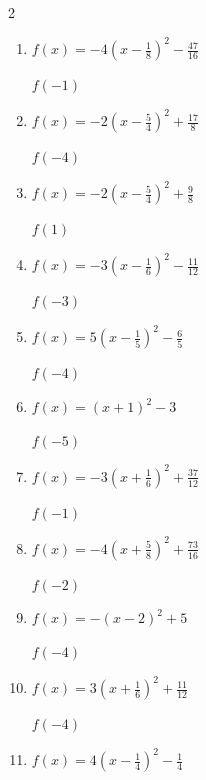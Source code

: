 \begin{multicols}{2}
\begin{enumerate}
$f(-3)$
        \phantom{$=-41$}

  \item $\displaystyle f(x)=-4\left( x-\frac{1}{8}\right)^{2}-\frac{47}{16}$

$f(-1)$
        \phantom{$=-8$}

\columnbreak %

  \item $\displaystyle f(x)=-2\left( x-\frac{5}{4}\right)^{2}+\frac{17}{8}$

$f(-4)$
        \phantom{$=-53$}

  \item $\displaystyle f(x)=-2\left( x-\frac{5}{4}\right)^{2}+\frac{9}{8}$

$f(1)$
        \phantom{$=1$}

  \item $\displaystyle f(x)=-3\left( x-\frac{1}{6}\right)^{2}-\frac{11}{12}$

$f(-3)$
        \phantom{$=-31$}

  \item $\displaystyle f(x)=5\left( x-\frac{1}{5}\right)^{2}-\frac{6}{5}$

$f(-4)$
        \phantom{$=87$}

  \item $\displaystyle f(x)=\left( x+1\right)^{2}-3$

$f(-5)$
        \phantom{$=13$}

\columnbreak %

\resetques

  \item $\displaystyle f(x)=-3\left( x+\frac{1}{6}\right)^{2}+\frac{37}{12}$

$f(-1)$
        \phantom{$=1$}

  \item $\displaystyle f(x)=-4\left( x+\frac{5}{8}\right)^{2}+\frac{73}{16}$

$f(-2)$
        \phantom{$=-3$}

  \item $\displaystyle f(x)=-\left( x-2\right)^{2}+5$

$f(-4)$
        \phantom{$=-31$}

  \item $\displaystyle f(x)=3\left( x+\frac{1}{6}\right)^{2}+\frac{11}{12}$

$f(-4)$
        \phantom{$=45$}

  \item $\displaystyle f(x)=4\left( x-\frac{1}{4}\right)^{2}-\frac{1}{4}$


\end{enumerate}
\end{multicols}
